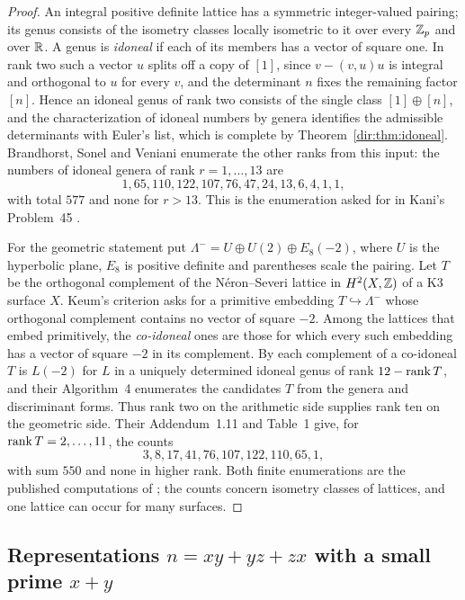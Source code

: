 \begin{proof}
An integral positive definite lattice has a symmetric integer-valued pairing; its genus
consists of the isometry classes locally isometric to it over every $\mathbb{Z}_p$ and over
$\mathbb{R}$. A genus is \emph{idoneal} if each of its members has a vector of square one. In
rank two such a vector $u$ splits off a copy of $[1]$, since $v-(v,u)u$ is integral and
orthogonal to $u$ for every $v$, and the determinant $n$ fixes the remaining factor
$[n]$. Hence an idoneal genus of rank two consists of the single class $[1]\oplus[n]$,
and the characterization of idoneal numbers by genera identifies the admissible
determinants with Euler's list, which is complete by Theorem~\ref{dir:thm:idoneal}.
Brandhorst, Sonel and Veniani
\cite[Remark~1.2 and Addendum~1.6]{BrandhorstSonelVeniani2025Idoneal} enumerate the
other ranks from this input: the numbers of idoneal genera of rank $r=1,\dots,13$ are
\[
 1,65,110,122,107,76,47,24,13,6,4,1,1,
\]
with total $577$ and none for $r>13$. This is the enumeration asked for in Kani's
Problem~45 \cite{Kani2011Idoneal}.

For the geometric statement put $\Lambda^-=U\oplus U(2)\oplus E_8(-2)$, where $U$ is
the hyperbolic plane, $E_8$ is positive definite and parentheses scale the pairing. Let
$T$ be the orthogonal complement of the N\'eron--Severi lattice in $H^2(X,\mathbb{Z})$ of a K3
surface $X$. Keum's criterion asks for a primitive embedding $T\hookrightarrow\Lambda^-$
whose orthogonal complement contains no vector of square $-2$. Among the lattices that
embed primitively, the \emph{co-idoneal} ones are those for which every such embedding
has a vector of square $-2$ in its complement. By
\cite[Proposition~3.15]{BrandhorstSonelVeniani2025Idoneal} each complement of a
co-idoneal $T$ is $L(-2)$ for $L$ in a uniquely determined idoneal genus of rank
$12-\operatorname{rank} T$, and their Algorithm~4 enumerates the candidates $T$ from the genera and
discriminant forms. Thus rank two on the arithmetic side supplies rank ten on the
geometric side. Their Addendum~1.11 and Table~1 give, for $\operatorname{rank} T=2,\dots,11$, the
counts
\[
 3,8,17,41,76,107,122,110,65,1,
\]
with sum $550$ and none in higher rank. Both finite enumerations are the published
computations of \cite{BrandhorstSonelVeniani2025Idoneal}; the counts concern isometry
classes of lattices, and one lattice can occur for many surfaces.
\end{proof}

\subsection{Representations \texorpdfstring{$n=xy+yz+zx$}{n = xy+yz+zx} with a small
prime \texorpdfstring{$x+y$}{x+y}}\label{dir:sec:xyz}

